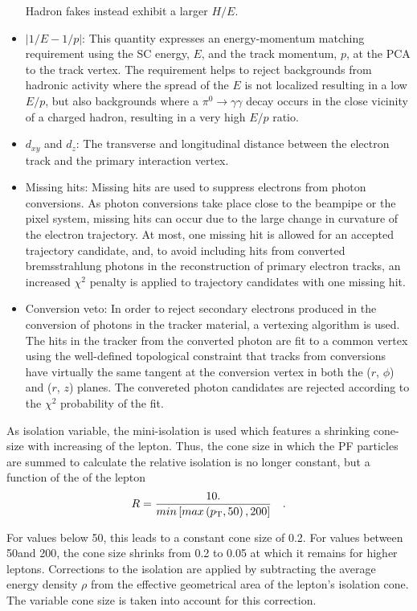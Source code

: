 \begin{itemize}
Hadron fakes instead exhibit a larger $H/E$. 
\item $|1/E - 1/p|$:
This quantity expresses an energy-momentum matching requirement using the SC energy, $E$, and the track momentum, $p$, at the PCA to the track vertex. 
The requirement helps to reject backgrounds from hadronic activity where the spread of the $E$ is not localized resulting in a low $E/p$, but also backgrounds where a $\pi^{0}\rightarrow\gamma\gamma$ decay occurs in the close vicinity of a charged hadron, resulting in a very high $E/p$ ratio.
\item $d_{xy}$ and $d_{z}$:
The transverse and longitudinal distance between the electron track and the primary interaction vertex.
\item Missing hits:
Missing hits are used to suppress electrons from photon conversions. 
As photon conversions take place close to the beampipe or the pixel system, missing hits can occur due to the large change in curvature of the electron trajectory. 
At most, one missing hit is allowed for an accepted trajectory candidate, and, to avoid including hits from converted bremsstrahlung photons in the reconstruction of primary electron tracks, an increased $\chi^{2}$ penalty is applied to trajectory candidates with one missing hit.
\item Conversion veto: In order to reject secondary electrons produced in the conversion of photons in the tracker material, a vertexing algorithm is used. 
The hits in the tracker from the converted photon are fit to a common vertex using the well-defined topological constraint that tracks from conversions have virtually the same tangent at the conversion vertex in both the ($r$, $\phi$) and ($r$, $z$) planes. 
The convereted photon candidates are rejected according to the $\chi^{2}$ probability of the fit.
\end{itemize}

As isolation variable, the mini-isolation is used which features a shrinking cone-size with increasing \pt of the lepton. 
Thus, the cone size in which the PF particles are summed to calculate the relative isolation is no longer constant, but a function of the \pt of the lepton
\begin{equation*}
    R = \frac{10.}{min\left[ max \left( p_{\mathrm{T}}, 50 \right), 200 \right]} \quad.
\end{equation*}

For \pt values below 50\GeV, this leads to a constant cone size of 0.2. 
For \pt values between 50\GeV and 200\GeV, the cone size shrinks from 0.2 to 0.05 at which it remains for higher \pt leptons.
Corrections to the isolation are applied by subtracting the average energy density $\rho$ from the effective geometrical area of the lepton's isolation cone. 
The variable cone size is taken into account for this correction.

